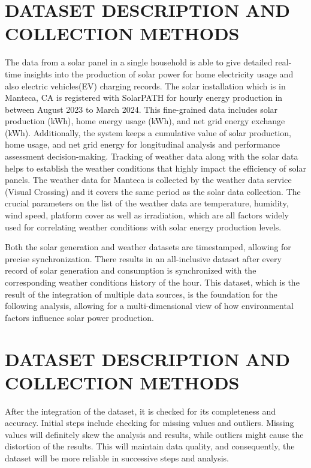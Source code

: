 \documentclass[conference]{IEEEtran}
\begin{document}
\section{DATASET DESCRIPTION AND COLLECTION METHODS}
The data from a solar panel in a single household is able to give detailed real-time insights into the production of solar power for home electricity usage and also electric vehicles(EV) charging records. The solar installation which is in Manteca, CA is registered with SolarPATH for hourly energy production in between August 2023 to March 2024. This fine-grained data includes solar production (kWh), home energy usage (kWh), and net grid energy exchange (kWh). Additionally, the system keeps a cumulative value of solar production, home usage, and net grid energy for longitudinal analysis and performance assessment decision-making.
Tracking of weather data along with the solar data helps to establish the weather conditions that highly impact the efficiency of solar panels. The weather data for Manteca is collected by the weather data service (Visual Crossing) and it covers the same period as the solar data collection. The crucial parameters on the list of the weather data are temperature, humidity, wind speed, platform cover as well as irradiation, which are all factors widely used for correlating weather conditions with solar energy production levels.

Both the solar generation and weather datasets are timestamped, allowing for precise synchronization. There results in an all-inclusive dataset after every record of solar generation and consumption is synchronized with the corresponding weather conditions history of the hour. This dataset, which is the result of the integration of multiple data sources, is the foundation for the following analysis, allowing for a multi-dimensional view of how environmental factors influence solar power production.

\section{DATASET DESCRIPTION AND COLLECTION METHODS}
After the integration of the dataset, it is checked for its completeness and accuracy. Initial steps include checking for missing values and outliers. Missing values will definitely skew the analysis and results, while outliers might cause the distortion of the results. This will maintain data quality, and consequently, the dataset will be more reliable in successive steps and analysis.
\end{document}

